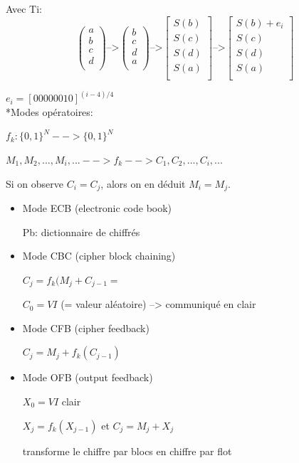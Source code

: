 \documentclass[12pt,a4paper]{article}
\begin{document}
Avec Ti: \begin{displaymath}
\begin{pmatrix}
a\\
b\\
c\\
d\\
\end{pmatrix}
\mbox{-->}
\begin{pmatrix}
b\\
c\\
d\\
a\\
\end{pmatrix}
\mbox{-->}
\begin{bmatrix}
S(b)\\
S(c)\\
S(d)\\
S(a)\\
\end{bmatrix}
\mbox{-->}
\begin{bmatrix}
S(b)+e_i\\
S(c)\\
S(d)\\
S(a)\\
\end{bmatrix}
\end{displaymath}

$e_{i}=[00000010]^{(i-4)/4}$
\\

*Modes opératoires:

$f_k:\{0,1\}^N-->\{0,1\}^N$

$M_1,M_2,...,M_i,... -->f_k-->C_1,C_2,...,C_i,...$

Si on observe $C_i=C_j$, alors on en déduit $M_i=M_j$.\\

\begin{itemize}
\item{Mode ECB (electronic code book)}

Pb: dictionnaire de chiffrés\\

\item{Mode CBC (cipher block chaining)}

$C_j=f_k(M_j+C_{j-1}=$

$C_0=VI$ (= valeur aléatoire) --> communiqué en clair\\

\item{Mode CFB (cipher feedback)}

$C_j=M_j+f_k(C_{j-1})$\\

\item{Mode OFB (output feedback)}

$X_0=VI$ clair

$X_j=f_k(X_{j-1})$ et $C_j=M_j+X_j$

transforme le chiffre par blocs en chiffre par flot\\

\end{itemize}
\end{document}
